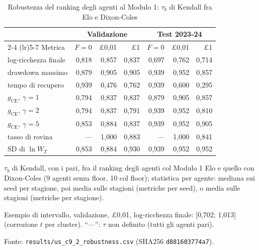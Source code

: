 \begin{table}[htbp]
\centering
\small
\caption{Robustezza del ranking degli agenti al Modulo 1: $\tau_b$ di Kendall fra Elo e Dixon-Coles}
\label{tab:s11_ranking}
\begin{tabular}{lrrrrrr}
\toprule
 & \multicolumn{3}{c}{Validazione} & \multicolumn{3}{c}{Test 2023-24} \\
\cmidrule(lr){2-4} \cmidrule(lr){5-7}
Metrica & $F = 0$ & \pounds{}0,01 & \pounds{}1 & $F = 0$ & \pounds{}0,01 & \pounds{}1 \\
\midrule
log-ricchezza finale & 0,818 & 0,857 & 0,837 & 0,697 & 0,762 & 0,714 \\
drawdown massimo & 0,879 & 0,905 & 0,905 & 0,939 & 0,952 & 0,857 \\
tempo di recupero & 0,939 & 0,476 & 0,762 & 0,939 & 0,600 & 0,295 \\
$g_{\mathrm{CE}}$, $\gamma = 1$ & 0,794 & 0,837 & 0,837 & 0,879 & 0,905 & 0,857 \\
$g_{\mathrm{CE}}$, $\gamma = 2$ & 0,794 & 0,837 & 0,791 & 0,939 & 0,952 & 0,810 \\
$g_{\mathrm{CE}}$, $\gamma = 5$ & 0,853 & 0,884 & 0,837 & 0,939 & 0,952 & 0,905 \\
tasso di rovina & --- & 1,000 & 0,883 & --- & 1,000 & 0,841 \\
SD di $\ln W_T$ & 0,853 & 0,884 & 0,930 & 0,939 & 0,952 & 0,952 \\
\bottomrule
\end{tabular}

\smallskip
\begin{minipage}{\linewidth}
\footnotesize
$\tau_b$ di Kendall, con i pari, fra il ranking degli agenti col Modulo 1 Elo e quello con Dixon-Coles (9 agenti senza floor, 10 col floor); statistica per agente: mediana sui seed per stagione, poi media sulle stagioni (metriche per seed), o media sulle stagioni (metriche per stagione).\par
Esempio di intervallo, validazione, \pounds{}0,01, log-ricchezza finale: [0,702; 1,013] (correzione $t$ per cluster). ``---'': $\tau$ non definito (tutti gli agenti pari).\par
Fonte: \texttt{results/us\_c9\_2\_robustness.csv} (SHA256 \texttt{d881603774a7}).
\end{minipage}
\end{table}
